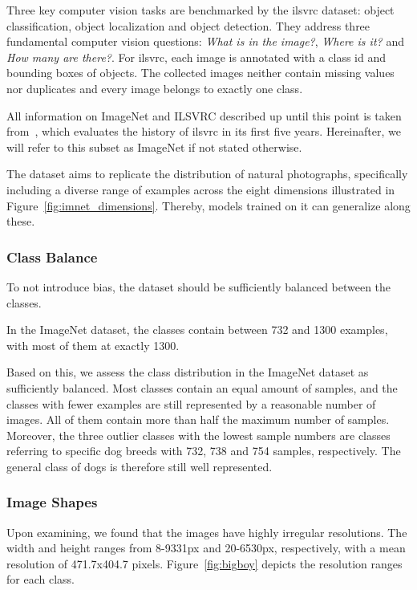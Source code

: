 Three key computer vision tasks are benchmarked by the \ac{ilsvrc} dataset: object classification, object
localization and object detection.
They address three fundamental computer vision questions: \textit{What is in the image?}, \textit{Where is it?} and
\textit{How many are there?}.
For \ac{ilsvrc}, each image is annotated with a class id and bounding boxes of objects.
The collected images neither contain missing values nor duplicates and every image belongs to exactly one class.

All information on ImageNet and ILSVRC described up until this point is taken from~\cite{imagenet_breakdown}, which
evaluates the history of \ac{ilsvrc} in its first five years.
Hereinafter, we will refer to this subset as ImageNet if not stated otherwise.

The dataset aims to replicate the distribution of natural photographs, specifically including a diverse range of
examples across the eight dimensions illustrated in Figure~\ref{fig:imnet_dimensions}.
Thereby, models trained on it can generalize along these.



\subsubsection{Class Balance}
To not introduce bias, the dataset should be sufficiently balanced between the classes.

In the ImageNet dataset, the classes contain between 732 and 1300 examples, with most of them at exactly 1300.

Based on this, we assess the class distribution in the ImageNet dataset as sufficiently balanced.
Most classes contain an equal amount of samples, and the classes with fewer examples are still represented by a
reasonable number of images.
All of them contain more than half the maximum number of samples.
Moreover, the three outlier classes with the lowest sample numbers are classes referring to specific dog
breeds with 732, 738 and 754 samples, respectively.
The general class of dogs is therefore still well represented.

\subsubsection{Image Shapes}
Upon examining, we found that the images have highly irregular resolutions.
The width and height ranges from 8-9331px and 20-6530px, respectively, with a mean resolution of 471.7x404.7 pixels.
Figure~\ref{fig:bigboy} depicts the resolution ranges for each class.

